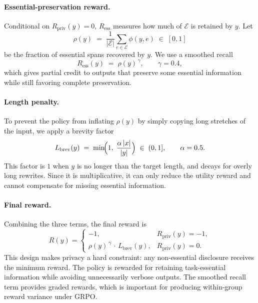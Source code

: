 \paragraph{Essential-preservation reward.}
Conditional on $R_{\text{priv}}(y) = 0$, $R_{\text{ess}}$ measures
how much of $\mathcal{E}$ is retained by $y$. Let
\begin{equation}
  \rho(y) \;=\; \frac{1}{|\mathcal{E}|}
              \sum_{e \in \mathcal{E}} \phi(y, e)
              \;\in\; [0, 1]
\end{equation}
be the fraction of essential spans recovered by $y$. We use a
smoothed recall
\begin{equation}
  R_{\text{ess}}(y) \;=\; \rho(y)^{\,\gamma},\qquad \gamma = 0.4,
\end{equation}
which gives partial credit to outputs that preserve some essential
information while still favoring complete preservation.

\paragraph{Length penalty.}
To prevent the policy from inflating $\rho(y)$ by simply copying long
stretches of the input, we apply a brevity factor
\begin{equation}
  L_{\text{brev}}(y) \;=\;
  \min\!\Bigl(1,\; \frac{\alpha\,|x|}{|y|}\Bigr)
  \;\in\; (0, 1],\qquad \alpha = 0.5.
\end{equation}
This factor is $1$ when $y$ is no longer than the target length, and
decays for overly long rewrites. Since it is multiplicative, it can
only reduce the utility reward and cannot compensate for missing
essential information.

\paragraph{Final reward.}
Combining the three terms, the final reward is
\begin{equation}
  R(y) =
  \begin{cases}
    -1, & R_{\text{priv}}(y) = -1, \\[4pt]
    \rho(y)^{\,\gamma}\,\cdot\,L_{\text{brev}}(y),
        & R_{\text{priv}}(y) = 0.
  \end{cases}
\end{equation}
This design makes privacy a hard constraint: any non-essential
disclosure receives the minimum reward. The policy is rewarded for
retaining task-essential information while avoiding unnecessarily
verbose outputs. The smoothed recall term provides graded rewards,
which is important for producing within-group reward variance under
GRPO.

